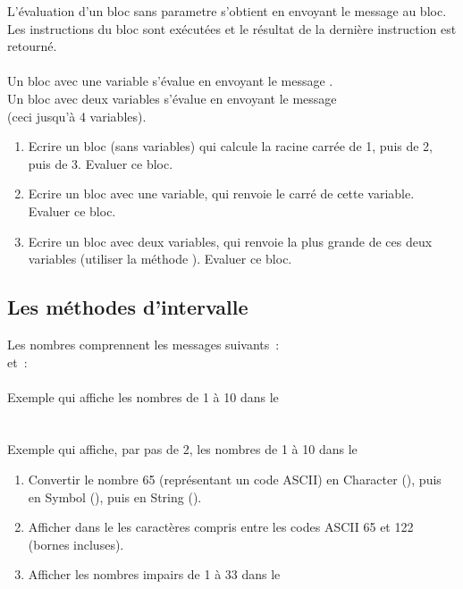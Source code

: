 L'\'evaluation d'un bloc sans parametre s'obtient en envoyant le message  au
bloc. Les instructions du bloc sont ex\'ecut\'ees et le r\'esultat de la
derni\`ere instruction est retourn\'e.\\
~\\
Un bloc avec une variable s'\'evalue en envoyant le message
.\\
Un bloc avec deux variables s'\'evalue en envoyant le message\\
(ceci jusqu'\`a 4 variables).

\begin{enumerate}
\item
Ecrire un bloc (sans variables) qui calcule la racine carr\'ee de 1, puis
de 2, puis de 3. Evaluer ce bloc.
\item
Ecrire un bloc avec une variable, qui renvoie le carr\'e de cette variable.  Evaluer ce bloc.
\item
Ecrire un bloc avec deux variables, qui renvoie la plus grande de ces deux
variables (utiliser la m\'ethode ). Evaluer ce bloc.
\end{enumerate}




\subsection{Les m\'ethodes d'intervalle}

Les nombres comprennent les messages suivants~:~
\\
et~:~
\\
~\\
Exemple qui affiche les nombres de 1 \`a 10 dans le \\
\\
~\\
Exemple qui affiche, par pas de 2, les nombres de 1 \`a 10 dans le
\\

\begin{enumerate}
\item Convertir le nombre 65 (repr\'esentant un code ASCII) en Character
(), puis en Symbol (),
puis en String ().
\item Afficher dans le  les caract\`eres compris entre les
codes ASCII 65 et 122 (bornes incluses).
\item
Afficher les nombres impairs de 1 \`a 33 dans le 
\end{enumerate}

